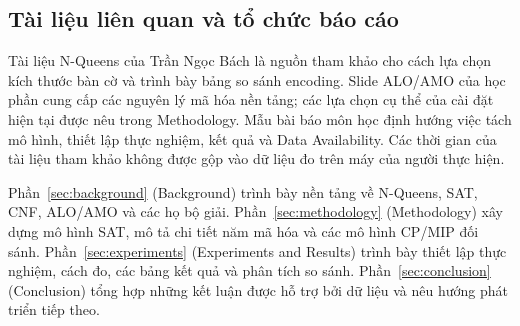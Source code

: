\subsection{Tài liệu liên quan và tổ chức báo cáo}
Tài liệu N-Queens của Trần Ngọc Bách \citep{bach2024} là nguồn tham khảo cho cách lựa chọn kích thước bàn cờ và trình bày bảng so sánh encoding. Slide ALO/AMO của học phần \citep{amoSlides} cung cấp các nguyên lý mã hóa nền tảng; các lựa chọn cụ thể của cài đặt hiện tại được nêu trong Methodology. Mẫu bài báo môn học \citep{courseTemplate} định hướng việc tách mô hình, thiết lập thực nghiệm, kết quả và Data Availability. Các thời gian của tài liệu tham khảo không được gộp vào dữ liệu đo trên máy của người thực hiện.


Phần~\ref{sec:background} (Background) trình bày nền tảng về N-Queens, SAT, CNF, ALO/AMO và các họ bộ giải. Phần~\ref{sec:methodology} (Methodology) xây dựng mô hình SAT, mô tả chi tiết năm mã hóa và các mô hình CP/MIP đối sánh. Phần~\ref{sec:experiments} (Experiments and Results) trình bày thiết lập thực nghiệm, cách đo, các bảng kết quả và phân tích so sánh. Phần~\ref{sec:conclusion} (Conclusion) tổng hợp những kết luận được hỗ trợ bởi dữ liệu và nêu hướng phát triển tiếp theo.
